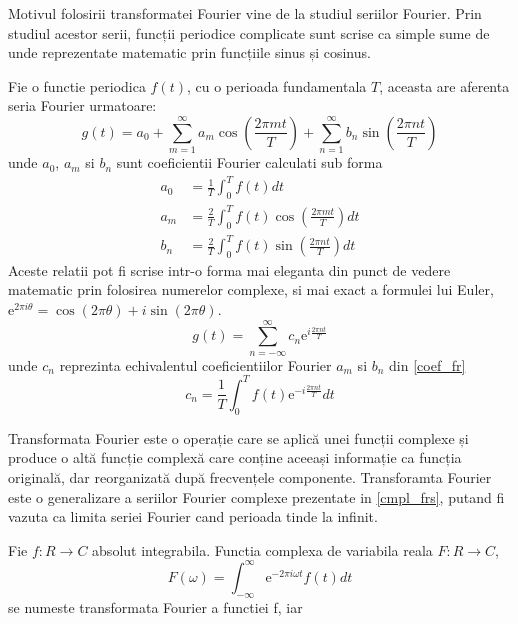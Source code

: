 \documentclass[a4paper,12pt]{book}
\begin{document}
			Motivul folosirii transformatei Fourier vine de la studiul seriilor Fourier. Prin studiul acestor serii, funcții periodice complicate sunt scrise ca simple sume de unde reprezentate matematic prin funcțiile sinus și cosinus.\par
			
			Fie o functie periodica $f(t)$, cu o perioada fundamentala $T$, aceasta are aferenta seria Fourier urmatoare:
			\begin{equation}
				g(t) = a_0 + \sum_{m=1}^{\infty} a_m \cos(\frac{2\pi m t}{T}) + \sum_{n=1}^{\infty} b_n \sin(\frac{2\pi n t}{T})
			\end{equation}			
			unde $a_0$, $a_m$ si $b_n$ sunt coeficientii Fourier calculati sub forma			 
			\begin{align}
			\nonumber 	a_0 &= \frac{1}{T} \int_{0}^{T} f(t) dt\\
			\nonumber 	a_m &= \frac{2}{T} \int_{0}^{T} f(t) \cos(\frac{2 \pi m t}{T}) dt \\ 
						b_n &= \frac{2}{T} \int_{0}^{T} f(t) \sin(\frac{2 \pi n t}{T}) dt \label{coef_fr}
			\end{align}
			Aceste relatii pot fi scrise intr-o forma mai eleganta din punct de vedere matematic prin folosirea numerelor complexe, si mai exact a formulei lui Euler,  \(\mathrm{e}^{2\pi i\theta} = \cos (2\pi \theta) + i \sin (2\pi \theta)\).			
			\begin{equation} \label{cmpl_frs}
				g(t) = \sum_{n=-\infty}^{\infty} c_n  \mathrm{e}^{i \frac{2\pi n t}{T}} 
			\end{equation}
			unde $c_n$ reprezinta echivalentul coeficientiilor Fourier $a_m$ si $b_n$ din \ref{coef_fr}			
			\begin{equation*}
			 	c_n = \frac{1}{T} \int_{0}^{T} f(t) \mathrm{e}^{-i \frac{2\pi n t}{T}} dt
			\end{equation*}
			
			Transformata Fourier este o operație care se aplică unei funcții complexe și produce o altă funcție complexă care conține aceeași informație ca funcția originală, dar reorganizată după frecvențele componente. Transforamta Fourier este o generalizare a seriilor Fourier complexe prezentate in \ref{cmpl_frs}, putand fi vazuta ca limita seriei Fourier cand perioada tinde la infinit.
				
			Fie $f : R \to C$ absolut integrabila. Functia complexa de variabila reala	$F : R \to C$,
			\begin{equation*}
						F(\omega) = \int_{-\infty}^{\infty}  \mathrm{e}^{-2\pi i\omega t} f(t) dt
			\end{equation*}
				se numeste transformata Fourier a functiei f, iar
			
\end{document}
